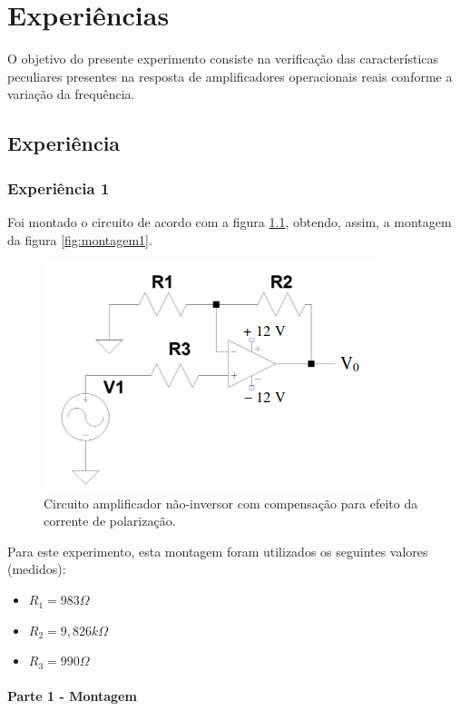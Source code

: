 \documentclass{abntex2}
\begin{document}
\imprimircapa
\imprimirfolhaderosto

\tableofcontents
\clearpage
\listoffigures
\listoftables
\clearpage


\chapter{Experiências}

 O objetivo do presente experimento consiste na verificação das características peculiares presentes na resposta
 de amplificadores operacionais reais conforme a variação da frequência.

\section{Experiência}
\subsection{Experiência 1}

Foi montado o circuito de acordo com a figura \ref{fig:circuito}, obtendo, assim, a montagem da figura \ref{fig:montagem1}.
\begin{figure}[h]
  \centering
  \includegraphics[scale = 0.5]{circuito.png}
  \caption{Circuito amplificador não-inversor com compensação para efeito da corrente de polarização.}
  \label{fig:circuito}
\end{figure}

Para este experimento, esta montagem foram utilizados os seguintes valores (medidos):
\begin{itemize}
  \item $R_1 = 983\Omega$
  \item $R_2 = 9,826k\Omega$
  \item $R_3 = 990\Omega$
\end{itemize}

\subsubsection{Parte 1 - Montagem}
\end{document}
